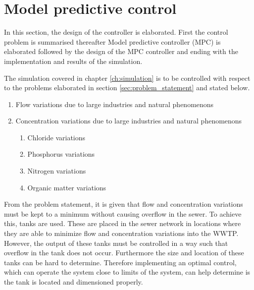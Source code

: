\section{Model predictive control}\label{se:model_predictive_control}
In this section, the design of the controller is elaborated. First the control problem is summarised thereafter Model predictive controller (MPC) is elaborated followed by the design of the MPC controller and ending with the implementation and results of the simulation. 

The simulation covered in chapter \ref{ch:simulation} is to be controlled with respect to the problems elaborated in section \ref{sec:problem_statement} and stated below. 
\begin{enumerate}
\item Flow variations due to large industries and natural phenomenons
\item Concentration variations due to large industries and natural phenomenons
\begin{enumerate}
	\item Chloride variations
	\item Phosphorus variations
	\item Nitrogen variations
	\item Organic matter variations
\end{enumerate}
\end{enumerate}

From the problem statement, it is given that flow and concentration variations must be kept to a minimum without causing overflow in the sewer. To achieve this, tanks are used. These are placed in the sewer network in locations where they are able to minimize flow and concentration variations into the WWTP. However, the output of these tanks must be controlled in a way such that overflow in the tank does not occur. Furthermore the size and location of these tanks can be hard to determine. Therefore implementing an optimal control, which can operate the system close to limits of the system, can help determine is the tank is located and dimensioned properly.


